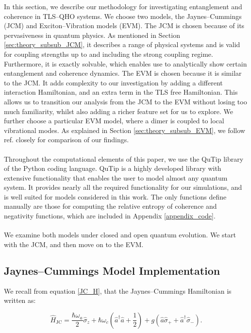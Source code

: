 \documentclass[11pt]{article}
\begin{document}
In this section, we describe our methodology for investigating entanglement and coherence in TLS--QHO systems. We choose two models, the Jaynes--Cummings (JCM) and Exciton--Vibration models (EVM). The JCM is chosen because of its pervasiveness in quantum physics. As mentioned in Section \ref{sec:theory_subsub_JCM}, it describes a range of physical systems and is valid for coupling strengths up to and including the strong coupling regime. Furthermore, it is exactly solvable, which enables use to analytically show certain entanglement and coherence dynamics. 
The EVM is chosen because it is similar to the JCM. It adds complexity to our investigation by adding a different interaction Hamiltonian, and an extra term in the TLS  free Hamiltonian. This allows us to transition our analysis from the JCM to the EVM without losing too much familiarity, whilst also adding a richer feature set for us to explore. We further choose a particular EVM model, where a dimer is coupled to local vibrational modes. As explained in Section \ref{sec:theory_subsub_EVM}, we follow ref. \cite{ExVib2014-Alexandra} closely for comparison of our findings. \\
\\
Throughout the computational elements of this paper, we use the QuTip library of the Python coding language. QuTip is a highly developed library with extensive functionality that enables the user to model almost any quantum system. It provides nearly all the required functionality for our simulations, and is well suited for models considered in this work. The only functions define manually are those for computing the relative entropy of coherence and negativity functions, which are included in Appendix \ref{appendix_code}.\\
\\
We examine both models under closed and open quantum evolution. We start with the JCM, and then move on to the EVM.

\subsection{Jaynes--Cummings Model Implementation} \label{sec:method_sub_JCM}

We recall from equation \eqref{JC_H}, that the Jaynes--Cummings Hamiltonian is written as:

\begin{equation*}
    \hat{H}_{\scriptscriptstyle \text{JC}} = \frac{\hbar\omega_a}{2}\hat{\sigma}_z + \hbar\omega_c\left(\hat{a}^\dagger \hat{a} + \frac{1}{2} \right) + g(\hat{a}\hat{\sigma}_{+} + \hat{a}^\dagger\hat{\sigma}_{-}). 
\end{equation*} 
\end{document}
